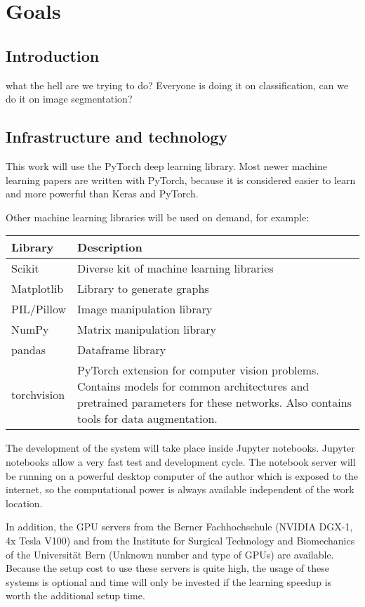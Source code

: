 \chapter{Goals}

\section{Introduction}
what the hell are we trying to do? Everyone is doing it on classification, can we do it on image segmentation?

\section{Infrastructure and technology}
This work will use the PyTorch\cite{paszke2017automatic} deep learning library. Most newer machine learning papers are written with PyTorch, because it is considered easier to learn and more powerful than Keras and PyTorch\cite{pytorchvstensorflow}.

Other machine learning libraries will be used on demand, for example:

\begin{tabular}{|p{3cm}|p{12.5cm}|}
    \hline
    \textbf{Library} & \textbf{Description} \\ \hline
    Scikit & Diverse kit of machine learning libraries \\ \hline
    Matplotlib & Library to generate graphs \\ \hline
    PIL/Pillow & Image manipulation library \\ \hline
    NumPy & Matrix manipulation library \\ \hline
    pandas & Dataframe library \\ \hline
    torchvision & PyTorch extension for computer vision problems. Contains models for common architectures and pretrained parameters for these networks. Also contains tools for data augmentation. \\ \hline
\end{tabular}

The development of the system will take place inside Jupyter notebooks. Jupyter notebooks allow a very fast test and development cycle. The notebook server will be running on a powerful desktop computer of the author which is exposed to the internet, so the computational power is always available independent of the work location.

In addition, the GPU servers from the Berner Fachhochschule (NVIDIA DGX-1, 4x Tesla V100) and from the Institute for Surgical Technology and Biomechanics of the Universität Bern (Unknown number and type of GPUs) are available. Because the setup cost to use these servers is quite high, the usage of these systems is optional and time will only be invested if the learning speedup is worth the additional setup time.

